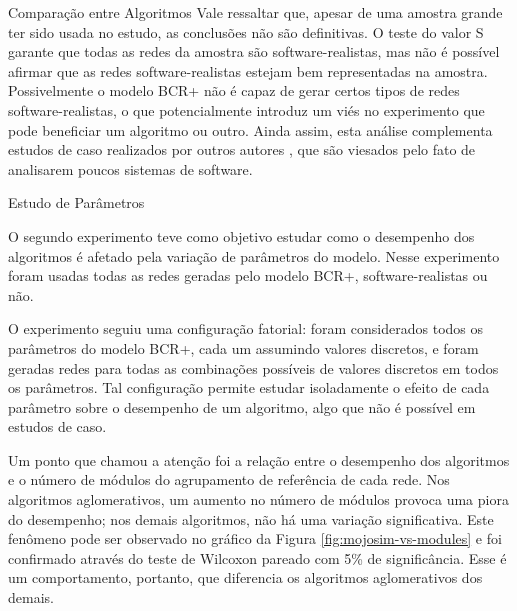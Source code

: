 \begin{section}{Comparação entre Algoritmos}
Vale ressaltar que, apesar de uma amostra grande ter sido usada no estudo, as conclusões não são definitivas. O teste do valor S garante que todas as redes da amostra são software-realistas, mas não é possível afirmar que as redes software-realistas estejam bem representadas na amostra. Possivelmente o modelo BCR+ não é capaz de gerar certos tipos de redes software-realistas, o que potencialmente introduz um viés no experimento que pode beneficiar um algoritmo ou outro. Ainda assim, esta análise complementa estudos de caso realizados por outros autores \cite{Wu2005,Andritsos2005}, que são viesados pelo fato de analisarem poucos sistemas de software.

\end{section}

\begin{section}{Estudo de Parâmetros}

O segundo experimento teve como objetivo estudar como o desempenho dos algoritmos é afetado pela variação de parâmetros do modelo. Nesse experimento foram usadas todas as redes geradas pelo modelo BCR+, software-realistas ou não.

O experimento seguiu uma configuração fatorial: foram considerados todos os parâmetros do modelo BCR+, cada um assumindo valores discretos, e foram geradas redes para todas as combinações possíveis de valores discretos em todos os parâmetros. Tal configuração permite estudar isoladamente o efeito de cada parâmetro sobre o desempenho de um algoritmo, algo que não é possível em estudos de caso.


Um ponto que chamou a atenção foi a relação entre o desempenho dos algoritmos e o número de módulos do agrupamento de referência de cada rede. Nos algoritmos aglomerativos, um aumento no número de módulos provoca uma piora do desempenho; nos demais algoritmos, não há uma variação significativa. Este fenômeno pode ser observado no gráfico da Figura \ref{fig:mojosim-vs-modules} e foi confirmado através do teste de Wilcoxon pareado com 5\% de significância. Esse é um comportamento, portanto, que diferencia os algoritmos aglomerativos dos demais. 


\end{section}

